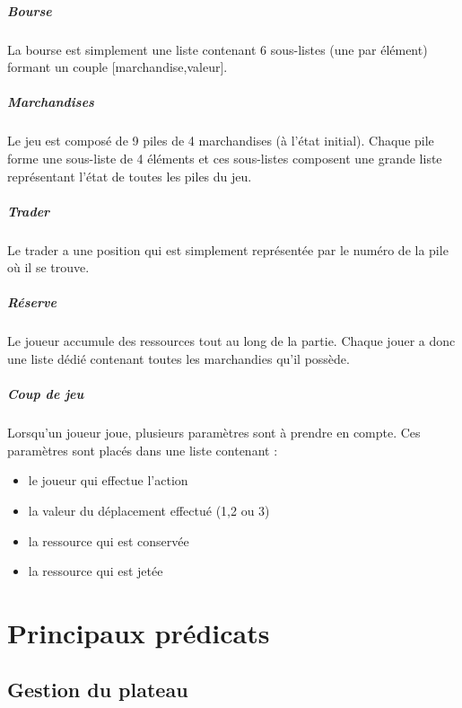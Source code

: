 \documentclass[11pt,a4paper,twoside,french,svgnames]{report}
\begin{document}
\paragraph{Bourse} La bourse est simplement une liste contenant 6 sous-listes (une par élément) formant un couple [marchandise,valeur].
\paragraph{Marchandises} Le jeu est composé de 9 piles de 4 marchandises (à l'état initial). Chaque pile forme une sous-liste de 4 éléments et ces sous-listes composent une grande liste représentant l'état de toutes les piles du jeu.
\paragraph{Trader} Le trader a une position qui est simplement représentée par le numéro de la pile où il se trouve.
\paragraph{Réserve}Le joueur accumule des ressources tout au long de la partie. Chaque jouer a donc une liste dédié contenant toutes les marchandies qu'il possède.
\paragraph{Coup de jeu}Lorsqu'un joueur joue, plusieurs paramètres sont à prendre en compte. Ces paramètres sont placés dans une liste contenant :
\begin{itemize}
	\item le joueur qui effectue l'action
    \item la valeur du déplacement effectué (1,2 ou 3)
    \item la ressource qui est conservée
    \item la ressource qui est jetée
\end{itemize}


\chapter{Principaux prédicats}
\section{Gestion du plateau}
\end{document}
